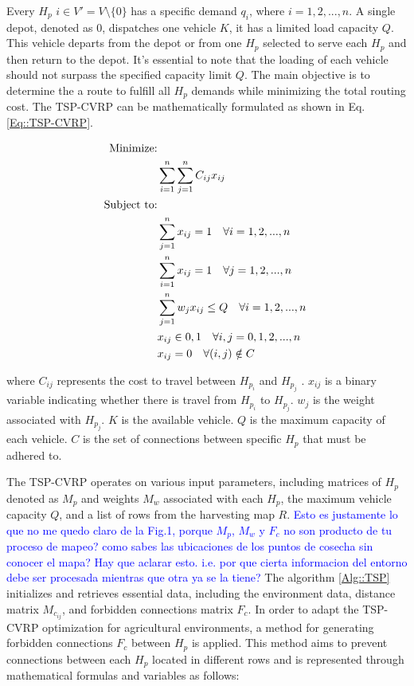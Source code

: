 \documentclass[conference]{IEEEtran}
\newcommand{\revL}[1]{\textcolor{blue}{#1}}
\begin{document}
Every $H_{p}$ $i \in V' = V \setminus \{0\}$ has a specific demand $q_i$, where $i = 1, 2, . . . , n$. A single depot, denoted as $0$, dispatches one vehicle $K$, it has a limited load capacity $Q$. This vehicle departs from the depot or from one $H_{p}$ selected to serve each $H_{p}$ and then return to the depot. It's essential to note that the loading of each vehicle should not surpass the specified capacity limit $Q$. The main objective is to determine the a route to fulfill all $H_{p}$ demands while minimizing the total routing cost. The TSP-CVRP can be mathematically formulated as shown in Eq. \ref{Eq::TSP-CVRP}.

\begin{align}
\label{Eq::TSP-CVRP}
\notag \text{Minimize:} & \ \\
& \sum_{i=1}^{n}\sum_{j=1}^{n} C_{ij} x_{ij} \ \\
\notag \text{Subject to:} & \ \\
& \notag \sum_{j=1}^{n} x_{ij} = 1 \quad \forall i = 1, 2, ..., n \ \\
& \notag \sum_{i=1}^{n} x_{ij} = 1 \quad \forall j = 1, 2, ..., n \ \\
& \notag \sum_{j=1}^{n} w_j x_{ij} \leq Q \quad \forall i = 1, 2, ..., n \ \\
& \notag x_{ij} \in {0, 1} \quad \forall i, j = 0, 1, 2, ..., n \ \\
& \notag x_{ij} = 0 \quad \forall (i,j) \notin C \
\end{align}

\noindent where $C_{ij}$ represents the cost to travel between  $H_{p_{i}}$  and $H_{p_{j}}$ .
$x_{ij}$ is a binary variable indicating whether there is travel from  $H_{p_{i}}$  to $H_{p_{j}}$.
$w_{j}$ is the weight associated with $H_{p_{j}}$.
$K$ is the available vehicle.
$Q$ is the maximum capacity of each vehicle.
$C$ is the set of connections between specific $H_{p}$ that must be adhered to.

The TSP-CVRP operates on various input parameters, including matrices of $H_{p}$ denoted as $M_{p}$ and weights $M_{w}$ associated with each $H_{p}$, the maximum vehicle capacity $Q$, and a list of rows from the harvesting map $R$. \revL{Esto es justamente lo que no me quedo claro de la Fig.1, porque $M_{p}$, $M_{w}$ y $F_{c}$ no son producto de tu proceso de mapeo? como sabes las ubicaciones de los puntos de cosecha sin conocer el mapa? Hay que aclarar esto. i.e. por que cierta informacion del entorno debe ser procesada mientras que otra ya se la tiene?} The algorithm \ref{Alg::TSP} initializes and retrieves essential data, including the environment data, distance matrix $M_{c_{ij}}$, and forbidden connections matrix $F_{c}$. In order to adapt the TSP-CVRP optimization for agricultural environments, a method for generating forbidden connections $F_{c}$ between $H_{p}$ is applied. This method aims to prevent connections between each $H_{p}$  located in different rows and is represented through mathematical formulas and variables as follows:
\end{document}
